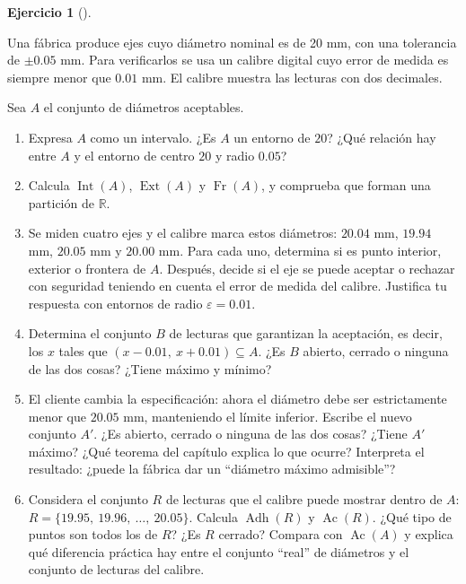\documentclass[
  spanish,
  a4paper,
]{scrreport}
\theoremstyle{definition}
\newtheorem{exercise}{Ejercicio}[chapter]
\theoremstyle{remark}
\begin{document}
\begin{exercise}[]\protect\hypertarget{exr-control-calidad}{}\label{exr-control-calidad}

Una fábrica produce ejes cuyo diámetro nominal es de 20 mm, con una
tolerancia de \(\pm 0.05\) mm. Para verificarlos se usa un calibre
digital cuyo error de medida es siempre menor que \(0.01\) mm. El
calibre muestra las lecturas con dos decimales.

Sea \(A\) el conjunto de diámetros aceptables.

\begin{enumerate}
\def\labelenumi{\alph{enumi}.}
\item
  Expresa \(A\) como un intervalo. ¿Es \(A\) un entorno de \(20\)? ¿Qué
  relación hay entre \(A\) y el entorno de centro \(20\) y radio
  \(0.05\)?
\item
  Calcula \(\operatorname{Int}(A)\), \(\operatorname{Ext}(A)\) y
  \(\operatorname{Fr}(A)\), y comprueba que forman una partición de
  \(\mathbb{R}\).
\item
  Se miden cuatro ejes y el calibre marca estos diámetros: \(20.04\) mm,
  \(19.94\) mm, \(20.05\) mm y \(20.00\) mm. Para cada uno, determina si
  es punto interior, exterior o frontera de \(A\). Después, decide si el
  eje se puede aceptar o rechazar con seguridad teniendo en cuenta el
  error de medida del calibre. Justifica tu respuesta con entornos de
  radio \(\varepsilon = 0.01\).
\item
  Determina el conjunto \(B\) de lecturas que garantizan la aceptación,
  es decir, los \(x\) tales que \((x - 0.01,\ x + 0.01) \subseteq A\).
  ¿Es \(B\) abierto, cerrado o ninguna de las dos cosas? ¿Tiene máximo y
  mínimo?
\item
  El cliente cambia la especificación: ahora el diámetro debe ser
  estrictamente menor que \(20.05\) mm, manteniendo el límite inferior.
  Escribe el nuevo conjunto \(A'\). ¿Es abierto, cerrado o ninguna de
  las dos cosas? ¿Tiene \(A'\) máximo? ¿Qué teorema del capítulo explica
  lo que ocurre? Interpreta el resultado: ¿puede la fábrica dar un
  ``diámetro máximo admisible''?
\item
  Considera el conjunto \(R\) de lecturas que el calibre puede mostrar
  dentro de \(A\): \(R = \{19.95,\ 19.96,\ \dots,\ 20.05\}\). Calcula
  \(\operatorname{Adh}(R)\) y \(\operatorname{Ac}(R)\). ¿Qué tipo de
  puntos son todos los de \(R\)? ¿Es \(R\) cerrado? Compara con
  \(\operatorname{Ac}(A)\) y explica qué diferencia práctica hay entre
  el conjunto ``real'' de diámetros y el conjunto de lecturas del
  calibre.
\end{enumerate}

\end{exercise}
\end{document}
